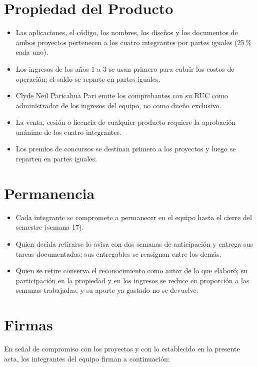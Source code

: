 \documentclass[11pt,a4paper]{article}
\begin{document}
\section{Propiedad del Producto}
\begin{itemize}[leftmargin=*]
    \item Las aplicaciones, el código, los nombres, los diseños y los documentos de ambos proyectos pertenecen a los cuatro integrantes por partes iguales (25\,\% cada uno).
    \item Los ingresos de los años 1 a 3 se usan primero para cubrir los costos de operación; el saldo se reparte en partes iguales.
    \item Clyde Neil Paricahua Pari emite los comprobantes con su RUC como administrador de los ingresos del equipo, no como dueño exclusivo.
    \item La venta, cesión o licencia de cualquier producto requiere la aprobación unánime de los cuatro integrantes.
    \item Los premios de concursos se destinan primero a los proyectos y luego se reparten en partes iguales.
\end{itemize}

\section{Permanencia}
\begin{itemize}[leftmargin=*]
    \item Cada integrante se compromete a permanecer en el equipo hasta el cierre del semestre (semana 17).
    \item Quien decida retirarse lo avisa con dos semanas de anticipación y entrega sus tareas documentadas; sus entregables se reasignan entre los demás.
    \item Quien se retire conserva el reconocimiento como autor de lo que elaboró; su participación en la propiedad y en los ingresos se reduce en proporción a las semanas trabajadas, y su aporte ya gastado no se devuelve.
\end{itemize}

\section{Firmas}
\noindent En señal de compromiso con los proyectos y con lo establecido en la presente acta, los integrantes del equipo firman a continuación:
\end{document}
